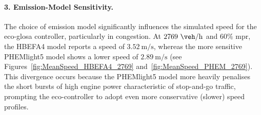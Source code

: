 \paragraph{3. Emission-Model Sensitivity.}
The choice of emission model significantly influences the simulated speed for the \ac{eco-glosa} controller, particularly in congestion. At $2769~\unit{\veh\per\hour}$ and $60\%$ \ac{mpr}, the HBEFA4 model reports a speed of $3.52~\unit{\metre\per\second}$, whereas the more sensitive PHEMlight5 model shows a lower speed of $2.89~\unit{\metre\per\second}$ (see Figures~\vref{fig:MeanSpeed_HBEFA4_2769} and~\vref{fig:MeanSpeed_PHEM_2769}). This divergence occurs because the PHEMlight5 model more heavily penalises the short bursts of high engine power characteristic of stop-and-go traffic, prompting the eco-controller to adopt even more conservative (slower) speed profiles.

